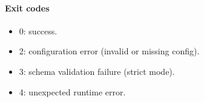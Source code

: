 \paragraph{Exit codes}
\begin{itemize}
    \item 0: success.
    \item 2: configuration error (invalid or missing config).
    \item 3: schema validation failure (strict mode).
    \item 4: unexpected runtime error.
\end{itemize}
